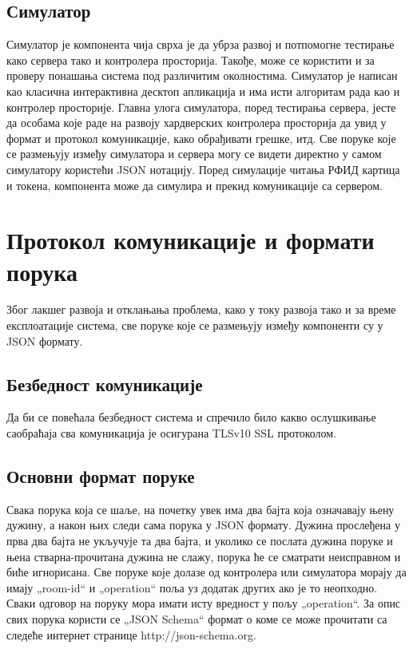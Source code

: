 \documentclass[a4paper, 12pt, diplomski]{etfcyr}
\def\quote#1{„#1“}
\begin{document}
			\subsection{Симулатор}
				\begin{justify}
					Симулатор је компонента чија сврха је да убрза развој и потпомогне тестирање како сервера тако и контролера просторија. Такође, може се користити и за проверу понашања система под различитим околностима. Симулатор је написан као класична интерактивна десктоп апликација и има исти алгоритам рада као и контролер просторије. Главна улога симулатора, поред тестирања сервера, јесте да особама које раде на развоју хардверских контролера просторија да увид у формат и протокол комуникације, како обрађивати грешке, итд. Све поруке које се размењују између симулатора и сервера могу се видети директно у самом симулатору користећи JSON нотацију. Поред симулације читања РФИД картица и токена, компонента може да симулира и прекид комуникације са сервером.
				\end{justify}

		\newpage

		\section{Протокол комуникације и формати порука}
			\begin{justify}
				Због лакшег развоја и отклањања проблема, како у току развоја тако и за време експлоатације система, све поруке које се размењују између компоненти су у JSON формату.
			\end{justify}

			\subsection{Безбедност комуникације}
				\begin{justify}
					Да би се повећала безбедност система и спречило било какво ослушкивање саобраћаја сва комуникација је осигурана TLSv10 SSL протоколом.
				\end{justify}
			
			\subsection{Основни формат поруке}
				\begin{justify}
					Свака порука која се шаље, на почетку увек има два бајта која означавају њену дужину, а након њих следи сама порука у JSON формату. Дужина прослеђена у прва два бајта не укључује та два бајта, и уколико се послата дужина поруке и њена стварна-прочитана дужина не слажу, порука ће се сматрати неисправном и биће игнорисана. Све поруке које долазе од контролера или симулатора морају да имају \quote{room-id} и \quote{operation} поља уз додатак других ако је то неопходно. Сваки одговор на поруку мора имати исту вредност у пољу \quote{operation}.
					За опис свих порука користи се \quote{JSON Schema} формат о коме се може прочитати са следеће интернет странице http://json-schema.org.
				\end{justify}
\end{document}
